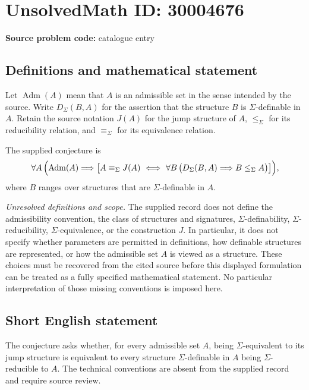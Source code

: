 \documentclass[11pt]{article}
\begin{document}
\section*{UnsolvedMath ID: 30004676}
\textbf{Source problem code:} catalogue entry
\subsection{Definitions and mathematical statement}
Let \(\operatorname{Adm}(A)\) mean that \(A\) is an admissible set in the sense intended by the source. Write \(D_\Sigma(B,A)\) for the assertion that the structure \(B\) is \(\Sigma\)-definable in \(A\). Retain the source notation \(J(A)\) for the jump structure of \(A\), \(\leq_\Sigma\) for its reducibility relation, and \(\equiv_\Sigma\) for its equivalence relation.

The supplied conjecture is
\[
\forall A\,\Bigl(\operatorname{Adm}(A)\Longrightarrow
\bigl[A\equiv_\Sigma J(A)
\ \Longleftrightarrow\ 
\forall B\,\bigl(D_\Sigma(B,A)\Longrightarrow B\leq_\Sigma A\bigr)\bigr]\Bigr),
\]
where \(B\) ranges over structures that are \(\Sigma\)-definable in \(A\).

\emph{Unresolved definitions and scope.} The supplied record does not define the admissibility convention, the class of structures and signatures, \(\Sigma\)-definability, \(\Sigma\)-reducibility, \(\Sigma\)-equivalence, or the construction \(J\). In particular, it does not specify whether parameters are permitted in definitions, how definable structures are represented, or how the admissible set \(A\) is viewed as a structure. These choices must be recovered from the cited source before this displayed formulation can be treated as a fully specified mathematical statement. No particular interpretation of those missing conventions is imposed here.
\subsection{Short English statement}
The conjecture asks whether, for every admissible set \(A\), being \(\Sigma\)-equivalent to its jump structure is equivalent to every structure \(\Sigma\)-definable in \(A\) being \(\Sigma\)-reducible to \(A\). The technical conventions are absent from the supplied record and require source review.
\end{document}
